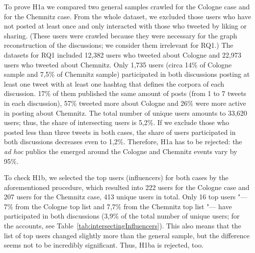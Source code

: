 To prove H1a we compared two general samples crawled for the Cologne case and for the Chemnitz case. From the whole dataset, we excluded those users who have not posted at least once and only interacted with those who tweeted by liking or sharing. (These users were crawled because they were necessary for the graph reconstruction of the discussions; we consider them irrelevant for RQ1.) The datasets for RQ1 included 12,382 users who tweeted about Cologne and 22,973 users who tweeted about Chemnitz. Only 1,735 users (circa 14\% of Cologne sample and 7,5\% of Chemnitz sample) participated in both discussions posting at least one tweet with at least one hashtag that defines the corpora of each discussion. 17\% of them published the same amount of posts (from 1 to 7 tweets in each discussion), 57\% tweeted more about Cologne and 26\% were more active in posting about Chemnitz. The total number of unique users amounts to 33,620 users; thus, the share of intersecting users is 5,2\%. If we exclude those who posted less than three tweets in both cases, the share of users participated in both discussions decreases even to 1,2\%. Therefore, H1a has to be rejected: the \textit{ad hoc} publics the emerged around the Cologne and Chemnitz events vary by 95\%.

To check H1b, we selected the top users (influencers) for both cases by the aforementioned procedure, which resulted into 222 users for the Cologne case and 207 users for the Chemnitz case, 413 unique users in total. Only 16 top users "--- 7\% from the Cologne top list and 7,7\% from the Chemnitz top list "--- have participated in both discussions (3,9\% of the total number of unique users; for the accounts, see Table~\cref{tab:intersectingInfluencers}). This also means that the list of top users changed slightly more than the general sample, but the difference seems not to be incredibly significant. Thus, H1ba is rejected, too.

